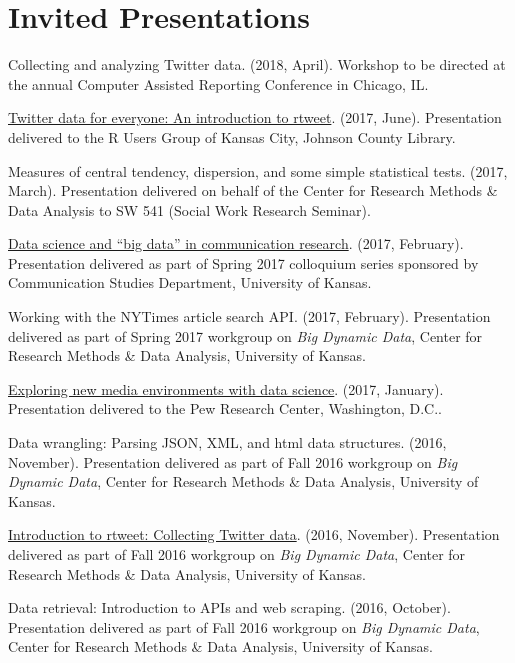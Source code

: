\documentclass[11pt,letterpaper]{article}
\begin{document}
\section{Invited Presentations}
  \begin{bibenum}
    \item[] Collecting and analyzing Twitter data. (2018, April). Workshop
      to be directed at the annual Computer Assisted Reporting Conference
      in Chicago, IL.
    \item[] \href{https://mkearney.github.io/rusersKC}{Twitter data for
      everyone: An introduction to rtweet}. (2017, June). Presentation
      delivered to the R Users Group of Kansas City, Johnson County
      Library.
    \item[] Measures of central tendency, dispersion, and some simple
      statistical tests. (2017, March). Presentation delivered on behalf
      of the Center for Research Methods \& Data Analysis to SW 541
      (Social Work Research Seminar).
    \item[]
      \href{https://mkearney.github.io/COLLOQUIUM/slides.html}{Data
      science and ``big data'' in communication research}. (2017,
      February).  Presentation delivered as part of Spring 2017 colloquium
      series sponsored by Communication Studies Department, University of
      Kansas.
    \item[] Working with the NYTimes article search API. (2017, February).
      Presentation delivered as part of Spring 2017 workgroup on \textit{Big
      Dynamic Data}, Center for Research Methods \& Data Analysis,
      University of Kansas.
    \item[]
      \href{https://mkearney.github.io/research_talk/pewtalk.html}{Exploring
      new media environments with data science}. (2017,
      January). Presentation delivered to the Pew Research Center,
      Washington, D.C..
    \item[] Data wrangling: Parsing JSON, XML, and html data
      structures. (2016, November). Presentation delivered as part of Fall
      2016 workgroup on \textit{Big Dynamic Data}, Center for Research
      Methods \& Data Analysis, University of Kansas.
    \item[]
      \href{https://github.com/mkearney/bigdata-workgroup}{Introduction to
      rtweet: Collecting Twitter data}. (2016, November). Presentation
      delivered as part of Fall 2016 workgroup on \textit{Big Dynamic Data},
      Center for Research Methods \& Data Analysis, University of Kansas.
    \item[] Data retrieval: Introduction to APIs and web scraping. (2016,
      October). Presentation delivered as part of Fall 2016 workgroup on
      \textit{Big Dynamic Data}, Center for Research Methods \& Data
      Analysis, University of Kansas.
  \end{bibenum}
\end{document}
